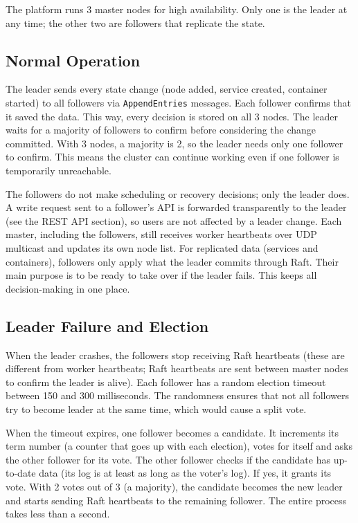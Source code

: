 The platform runs 3 master nodes for high availability. Only one is the leader at any time; the other two are followers that replicate the state.

\subsection{Normal Operation}

The leader sends every state change (node added, service created, container started) to all followers via \texttt{AppendEntries} messages. Each follower confirms that it saved the data. This way, every decision is stored on all 3 nodes. The leader waits for a majority of followers to confirm before considering the change committed. With 3 nodes, a majority is 2, so the leader needs only one follower to confirm. This means the cluster can continue working even if one follower is temporarily unreachable.

The followers do not make scheduling or recovery decisions; only the leader does. A write request sent to a follower's API is forwarded transparently to the leader (see the REST API section), so users are not affected by a leader change. Each master, including the followers, still receives worker heartbeats over UDP multicast and updates its own node list. For replicated data (services and containers), followers only apply what the leader commits through Raft. Their main purpose is to be ready to take over if the leader fails. This keeps all decision-making in one place.

\subsection{Leader Failure and Election}

When the leader crashes, the followers stop receiving Raft heartbeats (these are different from worker heartbeats; Raft heartbeats are sent between master nodes to confirm the leader is alive). Each follower has a random election timeout between 150 and 300 milliseconds. The randomness ensures that not all followers try to become leader at the same time, which would cause a split vote.

When the timeout expires, one follower becomes a candidate. It increments its term number (a counter that goes up with each election), votes for itself and asks the other follower for its vote. The other follower checks if the candidate has up-to-date data (its log is at least as long as the voter's log). If yes, it grants its vote. With 2 votes out of 3 (a majority), the candidate becomes the new leader and starts sending Raft heartbeats to the remaining follower. The entire process takes less than a second.

